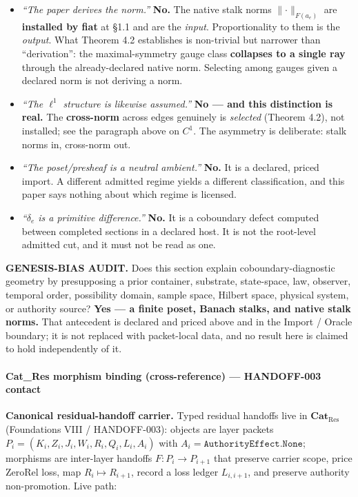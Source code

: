 \documentclass[
  11pt,
]{article}
\providecommand{\tightlist}{%
  \setlength{\itemsep}{0pt}\setlength{\parskip}{0pt}}
\providecommand{\tightlist}{%
  \setlength{\itemsep}{0pt}\setlength{\parskip}{0pt}}
\renewenvironment{quote}
  {\begin{leftbar}\small}
  {\end{leftbar}}
\begin{document}
\begin{itemize}
\tightlist
\item
  \emph{``The paper derives the norm.''} \textbf{No.} The native stalk norms \(\lVert\cdot\rVert_{F(a_e)}\) are \textbf{installed by fiat} at §1.1 and are the \emph{input}. Proportionality to them is the \emph{output}. What Theorem 4.2 establishes is non-trivial but narrower than ``derivation'': the maximal-symmetry gauge class \textbf{collapses to a single ray} through the already-declared native norm. Selecting among gauges given a declared norm is not deriving a norm.
\item
  \emph{``The \(\ell^1\) structure is likewise assumed.''} \textbf{No --- and this distinction is real.} The \textbf{cross-norm} across edges genuinely is \emph{selected} (Theorem 4.2), not installed; see the paragraph above on \(C^1\). The asymmetry is deliberate: stalk norms in, cross-norm out.
\item
  \emph{``The poset/presheaf is a neutral ambient.''} \textbf{No.} It is a declared, priced import. A different admitted regime yields a different classification, and this paper says nothing about which regime is licensed.
\item
  \emph{``\(\delta_e\) is a primitive difference.''} \textbf{No.} It is a coboundary defect computed between completed sections in a declared host. It is not the root-level admitted cut, and it must not be read as one.
\end{itemize}

\begin{quote}
\textbf{GENESIS-BIAS AUDIT.} Does this section explain coboundary-diagnostic geometry by presupposing a prior container, substrate, state-space, law, observer, temporal order, possibility domain, sample space, Hilbert space, physical system, or authority source? \textbf{Yes --- a finite poset, Banach stalks, and native stalk norms.} That antecedent is declared and priced above and in the Import / Oracle boundary; it is not replaced with packet-local data, and no result here is claimed to hold independently of it.

\mbox{}%
\paragraph{Cat\_Res morphism binding (cross-reference) --- HANDOFF-003 contact}\label{cat_res-morphism-binding-cross-reference-handoff-003-contact}
\end{quote}

\textbf{Canonical residual-handoff carrier.} Typed residual handoffs live in \(\mathbf{Cat}_{\mathrm{Res}}\) (Foundations VIII / HANDOFF-003): objects are layer packets \(P_i=(K_i,Z_i,J_i,W_i,R_i,Q_i,L_i,A_i)\) with \(A_i=\texttt{AuthorityEffect.None}\); morphisms are inter-layer handoffs \(F\colon P_i\to P_{i+1}\) that preserve carrier scope, price ZeroRel loss, map \(R_i\mapsto R_{i+1}\), record a loss ledger \(L_{i,i+1}\), and preserve authority non-promotion. Live path:
\end{document}
